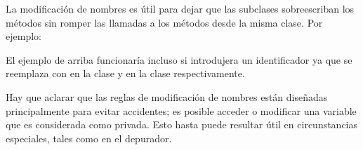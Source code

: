 \documentclass[a5paper,10pt,spanish]{sphinxmanual}
\begin{document}
\sphinxAtStartPar
La modificación de nombres es útil para dejar que las subclases sobreescriban los métodos sin romper las llamadas a los métodos desde la misma clase.  Por ejemplo:

\begin{sphinxVerbatim}[commandchars=\\\{\}]
 
      
          \PYG{p}{[}\PYG{p}{]}

      
           

         

 

       
            
\end{sphinxVerbatim}

\sphinxAtStartPar
El ejemplo de arriba funcionaría incluso si  introdujera un identificador  ya que se reemplaza con  en la clase   y  en la clase  respectivamente.

\sphinxAtStartPar
Hay que aclarar que las reglas de modificación de nombres están diseñadas principalmente para evitar accidentes; es posible acceder o modificar una variable que es considerada como privada.  Esto hasta puede resultar útil en circunstancias especiales, tales como en el depurador.
\end{document}
